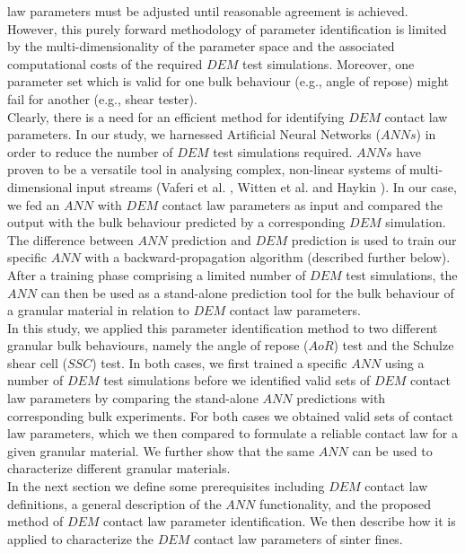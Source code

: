 \documentclass[review]{elsarticle}
\begin{document}
law parameters must be adjusted until reasonable agreement is achieved.\\
However, this purely forward methodology of parameter identification is limited by 
the multi-dimensionality of the parameter space and the associated computational costs of the required 
$DEM$ test simulations. 
Moreover, one parameter set which is valid for one bulk behaviour (e.g., angle
of repose) might fail for another (e.g., shear tester). \\
Clearly, there is a need for an efficient method for identifying
$DEM$ contact law parameters.
In our study, we harnessed Artificial Neural Networks ($ANNs$) in order to
reduce the number of $DEM$ test simulations required. 
$ANNs$ have proven to be a versatile tool in analysing complex, non-linear
systems of multi-dimensional input streams (Vaferi et al. \cite{RefWorks:150}, Witten et
al. \cite{RefWorks:174} and Haykin \cite{RefWorks:158}).
In our case, we fed an $ANN$ with $DEM$ contact law parameters as input
and compared the output with the bulk behaviour 
predicted by a corresponding $DEM$ simulation. 
The difference between $ANN$ prediction and $DEM$ prediction is used to train our 
specific $ANN$ with a backward-propagation algorithm (described further below). 
After a training phase comprising a limited number of $DEM$ test simulations,
the $ANN$ can then be used as a stand-alone prediction tool for the bulk behaviour of a 
granular material in relation to $DEM$ contact law parameters. \\
In this study, we applied this parameter identification method to two different
granular bulk behaviours, namely the angle of repose ($AoR$) test and the
Schulze shear cell ($SSC$) test.
In both cases, we first trained a specific $ANN$ using a number of $DEM$ test
simulations before we identified valid sets of $DEM$ contact law parameters by
comparing the stand-alone $ANN$ predictions with corresponding bulk experiments. 
For both cases we obtained valid sets of contact law parameters, 
which we then compared to formulate a reliable contact law for a given
granular material.
We further show that the same $ANN$ can be used to characterize different granular materials. \\
In the next section we define some prerequisites including $DEM$ contact law
definitions, a general description of the $ANN$ functionality, and the proposed
method of $DEM$ contact law parameter identification.
We then describe how it is applied to characterize the $DEM$ contact law
parameters of sinter fines.
\end{document}
